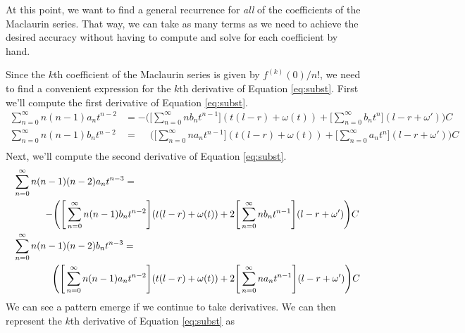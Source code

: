 \documentclass{report}
\begin{document}
At this point, we want to find a general recurrence for \emph{all} of the
coefficients of the Maclaurin series. That way, we can take as many
terms as we need to achieve the desired accuracy without having to
compute and solve for each coefficient by hand.

Since the $k$th coefficient of the Maclaurin series is given by $f^{(k)}(0)/n!$, we need to find a convenient expression for the $k$th derivative of
Equation \ref{eq:subst}.
First we'll compute the first derivative of Equation \ref{eq:subst}.
\begin{equation} \label{eq:diff1}
    \begin{aligned}
    \sum_{n=0}^\infty n(n-1)a_n t^{n-2} &=
        -\Bigg(\Bigg[\sum_{n=0}^\infty nb_n t^{n-1} \Bigg]
            (t(l-r)+\omega(t))
                + \Bigg[\sum_{n=0}^\infty b_n t^n \Bigg]
                (l - r + \omega')\Bigg)C\\
    \sum_{n=0}^\infty n(n-1)b_n t^{n-2} &=
        \phantom{-}\Bigg(\Bigg[\sum_{n=0}^\infty na_n t^{n-1} \Bigg]
            (t(l-r)+\omega(t))
                + \Bigg[\sum_{n=0}^\infty a_n t^n \Bigg]
                (l - r + \omega')\Bigg)C\\
    \end{aligned}
\end{equation}
Next, we'll compute the second derivative of Equation \ref{eq:subst}.
\begin{equation} \label{eq:diff2}
    \begin{gathered}
    \shoveleft{\sum_{n=0}^\infty n(n-1)(n-2)a_n t^{n-3} =}\\
        \qquad\qquad-\Bigg(\Bigg[\sum_{n=0}^\infty n(n-1)b_n t^{n-2} \Bigg]
             (t(l-r)+\omega(t))
                + 2\Bigg[\sum_{n=0}^\infty n b_n t^{n-1} \Bigg]
                (l - r + \omega')\Bigg)C\\
    \shoveleft{\sum_{n=0}^\infty n(n-1)(n-2)b_n t^{n-3} =}\\
        \qquad\qquad\phantom{-}\Bigg(\Bigg[\sum_{n=0}^\infty n(n-1)a_n t^{n-2} \Bigg]
            (t(l-r)+\omega(t))
                + 2\Bigg[\sum_{n=0}^\infty n a_n t^{n-1} \Bigg]
                (l - r + \omega')\Bigg)C\\
    \end{gathered}
\end{equation}
We can see a pattern emerge if we continue to take derivatives.
We can then represent the $k$th derivative of Equation \ref{eq:subst} as
\end{document}
